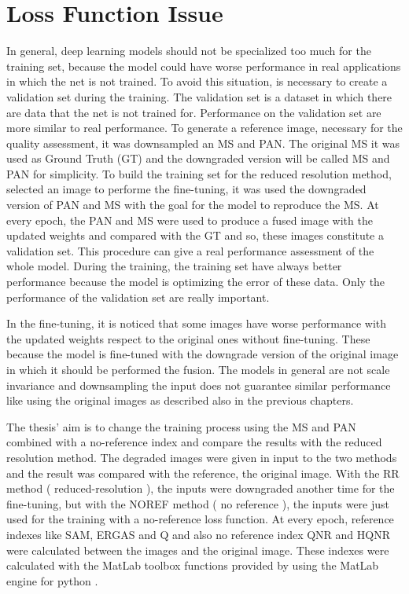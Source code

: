 \documentclass[12pt]{report}
\begin{document}
\section{Loss Function Issue}
In general, deep learning models should not be specialized too much for the training set, 
because the model could have worse performance in real applications in which the net is not trained.
To avoid this situation, is necessary to create a validation set during the training. The validation set is a dataset
in which there are data that the net is not trained for. Performance on the validation set are more similar to real performance.
To generate a reference image, necessary for the quality assessment, it was downsampled an MS and PAN.
The original MS it was used as Ground Truth (GT) and the downgraded version will be called MS and PAN for simplicity.
To build the training set for the reduced resolution method, selected an image to performe the fine-tuning, it was used the downgraded version of PAN and MS with
the goal for the model to reproduce the MS. At every epoch, the PAN and MS were used 
to produce a fused image with the updated weights and compared with the GT and so, these images constitute a validation set. 
This procedure can give a real performance assessment of the whole model.
During the training, the training set have always better performance because the model is optimizing the 
error of these data. Only the performance of the validation set are really important. 

In the fine-tuning, it is noticed that some images have worse performance with the updated weights 
respect to the original ones without fine-tuning.
These because the model is fine-tuned with the downgrade version of the original image in which it should be performed the fusion.
The models in general are not scale invariance and downsampling the input does not guarantee similar performance like using the original images
as described also in the previous chapters.

The thesis' aim is to change the training process using the MS and PAN combined with a no-reference index 
and compare the results with the reduced resolution method. 
The degraded images were given in input to the two methods and the result was compared with the reference, the original image.
With the RR method ( reduced-resolution ), the inputs were downgraded another time for the fine-tuning, 
but with the NOREF method ( no reference ), the inputs were just used for the training with a no-reference loss function.
At every epoch, reference indexes like SAM, ERGAS and Q and also no reference index QNR and HQNR were calculated  between the images and the original image.
These indexes were calculated with the MatLab toolbox functions provided by \cite{criticalComparison} using the MatLab engine 
for python \cite{matlab}.
\end{document}
